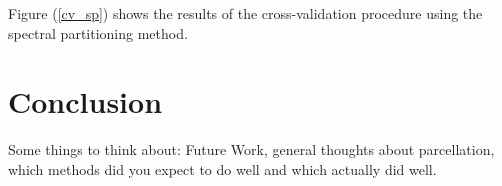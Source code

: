 Figure (\ref{cv_sp}) shows the results of the cross-validation procedure
using the spectral partitioning method.

\section{Conclusion}


{\color{red}Some things to think about: Future Work, general thoughts about
parcellation, which methods did you expect to do well and which actually did
well.}
